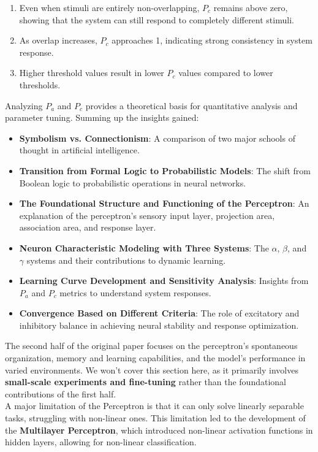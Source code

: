 \documentclass[11p,oneside]{book}
\begin{document}
\begin{enumerate}
    \item Even when stimuli are entirely non-overlapping, $P_c$ remains above zero, showing that the system can still respond to completely different stimuli.
    \item As overlap increases, $P_c$ approaches 1, indicating strong consistency in system response.
    \item Higher threshold values result in lower $P_c$ values compared to lower thresholds.
\end{enumerate}

Analyzing $P_a$ and $P_c$ provides a theoretical basis for quantitative analysis and parameter tuning. Summing up the insights gained:

\begin{itemize}
    \item \textbf{Symbolism vs. Connectionism}: A comparison of two major schools of thought in artificial intelligence.
    \item \textbf{Transition from Formal Logic to Probabilistic Models}: The shift from Boolean logic to probabilistic operations in neural networks.
    \item \textbf{The Foundational Structure and Functioning of the Perceptron}: An explanation of the perceptron's sensory input layer, projection area, association area, and response layer.
    \item \textbf{Neuron Characteristic Modeling with Three Systems}: The $\alpha$, $\beta$, and $\gamma$ systems and their contributions to dynamic learning.
    \item \textbf{Learning Curve Development and Sensitivity Analysis}: Insights from $P_a$ and $P_c$ metrics to understand system responses.
    \item \textbf{Convergence Based on Different Criteria}: The role of excitatory and inhibitory balance in achieving neural stability and response optimization.
\end{itemize}

The second half of the original paper focuses on the perceptron’s spontaneous organization, memory and learning capabilities, and the model's performance in varied environments. We won’t cover this section here, as it primarily involves \textbf{small-scale experiments and fine-tuning} rather than the foundational contributions of the first half. \\

A major limitation of the Perceptron is that it can only solve linearly separable tasks, struggling with non-linear ones. This limitation led to the development of the \textbf{Multilayer Perceptron}, which introduced non-linear activation functions in hidden layers, allowing for non-linear classification. \\
\end{document}
